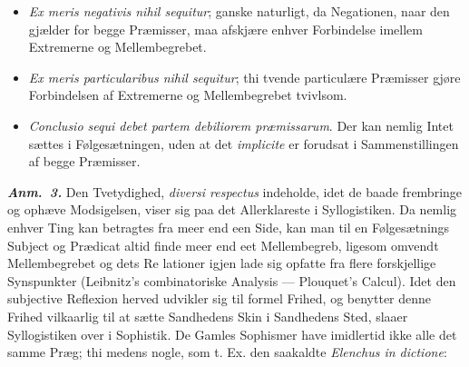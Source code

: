 \documentclass[12pt]{book}
\newcommand{\anm}[1]{\emph{\textbf{Anm.~#1.}}}
\newcommand{\opage}[1]{\marginnote{\footnotesize\textit{[#1]}}}
\begin{document}
\begin{itemize}
\item[1)] \textit{Ex meris negativis nihil sequitur}; ganske naturligt, da
  Negationen, naar den gjælder for begge Præmisser, maa afskjære enhver Forbindelse
  imellem Extremerne og Mellembegrebet.
\item[2)] \textit{Ex meris particularibus nihil sequitur}; thi tvende particulære
  Præmisser gjøre Forbindelsen af Extremerne og Mellembegrebet tvivlsom.
\item[3)] \textit{Conclusio sequi debet partem debiliorem præmissarum}. Der kan
  nemlig Intet sættes i Følgesætningen, uden at det \textit{implicite} er forudsat i
  Sammenstillingen af begge Præmisser.
\end{itemize}

\anm{3} Den Tvetydighed, \textit{diversi respectus} indeholde, idet de baade
frembringe og ophæve Modsigelsen, viser sig paa det Allerklareste i Syllogistiken.
Da nemlig enhver Ting kan betragtes fra meer end een Side, kan man til en
Følgesætnings Subject og Prædicat altid finde meer end eet Mellembegreb, ligesom
omvendt Mellembegrebet og dets Re\-%
\opage{71}lationer igjen lade sig opfatte fra flere forskjellige Synspunkter (Leibnitz's
combinatoriske Analysis --- Plouquet's Calcul). Idet den subjective Reflexion
herved udvikler sig til formel Frihed, og benytter denne Frihed vilkaarlig til at
sætte Sandhedens Skin i Sandhedens Sted, slaaer Syllogistiken over i
Sophistik. De Gamles Sophismer have imidlertid ikke alle det samme Præg; thi medens
nogle, som t. Ex. den saakaldte \textit{Elenchus in dictione}:
\end{document}
